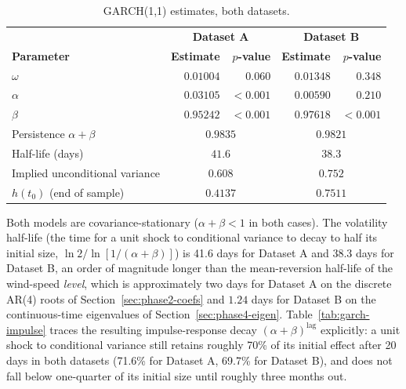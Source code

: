 \begin{table}[htbp]
\centering
\caption{GARCH(1,1) estimates, both datasets.}
\label{tab:garch}
\begin{tabular}{l r r r r}
\toprule
& \multicolumn{2}{c}{\textbf{Dataset A}} & \multicolumn{2}{c}{\textbf{Dataset B}} \\
\textbf{Parameter} & \textbf{Estimate} & \textbf{$p$-value} & \textbf{Estimate} & \textbf{$p$-value} \\
\midrule
$\omega$ & $0.01004$ & $0.060$ & $0.01348$ & $0.348$ \\
$\alpha$ & $0.03105$ & $<0.001$ & $0.00590$ & $0.210$ \\
$\beta$ & $0.95242$ & $<0.001$ & $0.97618$ & $<0.001$ \\
\midrule
Persistence $\alpha + \beta$ & \multicolumn{2}{c}{$0.9835$} & \multicolumn{2}{c}{$0.9821$} \\
Half-life (days) & \multicolumn{2}{c}{$41.6$} & \multicolumn{2}{c}{$38.3$} \\
Implied unconditional variance & \multicolumn{2}{c}{$0.608$} & \multicolumn{2}{c}{$0.752$} \\
$h(t_0)$ (end of sample) & \multicolumn{2}{c}{$0.4137$} & \multicolumn{2}{c}{$0.7511$} \\
\bottomrule
\end{tabular}
\end{table}

Both models are covariance-stationary ($\alpha + \beta < 1$ in both cases). The volatility half-life (the time for a unit shock to conditional variance to decay to half its initial size, $\ln 2 / \ln[1/(\alpha+\beta)]$) is 41.6 days for Dataset A and 38.3 days for Dataset B, an order of magnitude longer than the mean-reversion half-life of the wind-speed \emph{level}, which is approximately two days for Dataset A on the discrete AR(4) roots of Section~\ref{sec:phase2-coefs} and $1.24$ days for Dataset B on the continuous-time eigenvalues of Section~\ref{sec:phase4-eigen}. Table~\ref{tab:garch-impulse} traces the resulting impulse-response decay $(\alpha+\beta)^{\text{lag}}$ explicitly: a unit shock to conditional variance still retains roughly 70\% of its initial effect after 20 days in both datasets (71.6\% for Dataset A, 69.7\% for Dataset B), and does not fall below one-quarter of its initial size until roughly three months out.


